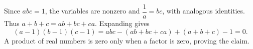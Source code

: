 Since $abc=1$, the variables are nonzero and $\dfrac{1}{a}=bc$, with analogous identities. Thus $a+b+c=ab+bc+ca$. Expanding gives
\[
(a-1)(b-1)(c-1)=abc-(ab+bc+ca)+(a+b+c)-1=0.
\]
A product of real numbers is zero only when a factor is zero, proving the claim.
